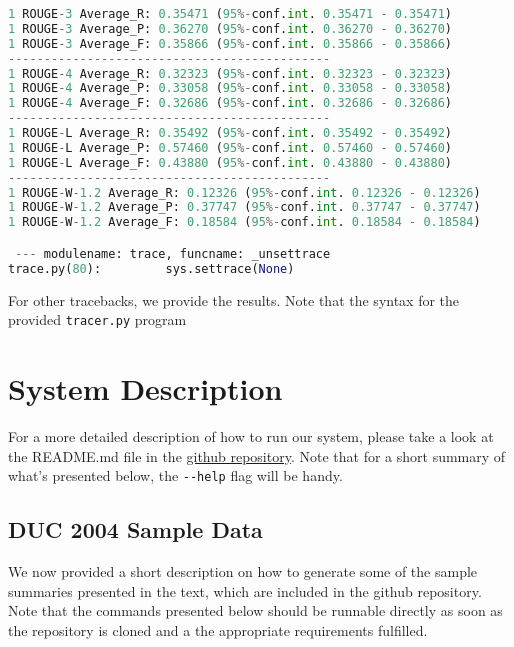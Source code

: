 \documentclass[11pt]{article}
\begin{document}
\begin{lstlisting}[language=Python]
1 ROUGE-3 Average_R: 0.35471 (95%-conf.int. 0.35471 - 0.35471)
1 ROUGE-3 Average_P: 0.36270 (95%-conf.int. 0.36270 - 0.36270)
1 ROUGE-3 Average_F: 0.35866 (95%-conf.int. 0.35866 - 0.35866)
---------------------------------------------
1 ROUGE-4 Average_R: 0.32323 (95%-conf.int. 0.32323 - 0.32323)
1 ROUGE-4 Average_P: 0.33058 (95%-conf.int. 0.33058 - 0.33058)
1 ROUGE-4 Average_F: 0.32686 (95%-conf.int. 0.32686 - 0.32686)
---------------------------------------------
1 ROUGE-L Average_R: 0.35492 (95%-conf.int. 0.35492 - 0.35492)
1 ROUGE-L Average_P: 0.57460 (95%-conf.int. 0.57460 - 0.57460)
1 ROUGE-L Average_F: 0.43880 (95%-conf.int. 0.43880 - 0.43880)
---------------------------------------------
1 ROUGE-W-1.2 Average_R: 0.12326 (95%-conf.int. 0.12326 - 0.12326)
1 ROUGE-W-1.2 Average_P: 0.37747 (95%-conf.int. 0.37747 - 0.37747)
1 ROUGE-W-1.2 Average_F: 0.18584 (95%-conf.int. 0.18584 - 0.18584)

 --- modulename: trace, funcname: _unsettrace
trace.py(80):         sys.settrace(None)

\end{lstlisting}

For other tracebacks, we provide the results. Note that the syntax for the provided \verb|tracer.py| program 

\section{System Description}
For a more detailed description of how to run our system, please take a look at the README.md file in the \href{https://github.com/kandluis/document_summaries}{github repository}. Note that for a short summary of what's presented below, the \verb|--help| flag will be handy.

\subsection{DUC 2004 Sample Data}
\label{subsec:duc_sample_data}
We now provided a short description on how to generate some of the sample summaries presented in the text, which are included in the github repository. Note that the commands presented below should be runnable directly as soon as the repository is cloned and a the appropriate requirements fulfilled. 
\end{document}
